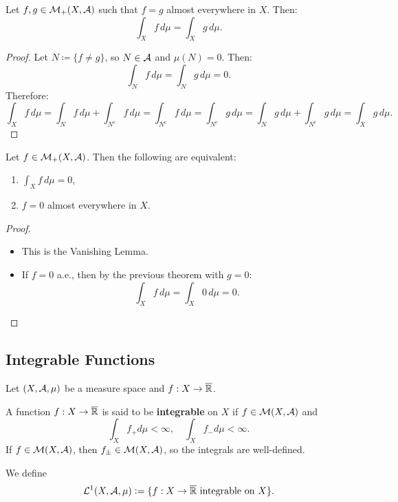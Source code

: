 \begin{theorem}
Let $f, g \in \mathcal{M}_+(X, \mathcal{A})$ such that $f = g$ almost everywhere in $X$. Then:
\[
\int_X f \, d\mu = \int_X g \, d\mu.
\]
\end{theorem}

\begin{proof}
Let $N \coloneqq \{f \neq g\}$, so $N \in \mathcal{A}$ and $\mu(N) = 0$. Then:
\[
\int_N f \, d\mu = \int_N g \, d\mu = 0.
\]
Therefore:
\[
\int_X f \, d\mu = \int_N f \, d\mu + \int_{N^c} f \, d\mu = \int_{N^c} f \, d\mu = \int_{N^c} g \, d\mu = \int_N g \, d\mu + \int_{N^c} g \, d\mu = \int_X g \, d\mu.
\]
\end{proof}

\begin{corollary}
Let $f \in \mathcal{M}_+(X, \mathcal{A})$. Then the following are equivalent:
\begin{enumerate}
    \item $\int_X f \, d\mu = 0$,
    \item $f = 0$ almost everywhere in $X$.
\end{enumerate}
\end{corollary}

\begin{proof}
\begin{itemize}[leftmargin=5em]
    \item [$(1) \Rightarrow (2)$] This is the Vanishing Lemma.
    \item [$(2) \Rightarrow (1)$] If $f = 0$ a.e., then by the previous theorem with $g = 0$:
    \[
    \int_X f \, d\mu = \int_X 0 \, d\mu = 0.
    \]
\end{itemize}
\end{proof}

\subsection{Integrable Functions}

Let $(X, \mathcal{A}, \mu)$ be a measure space and $f : X \to \overline{\mathbb{R}}$.

\begin{definition}
A function $f : X \to \overline{\mathbb{R}}$ is said to be \textbf{integrable} on $X$ if $f \in \mathcal{M}(X, \mathcal{A})$ and
\[
\int_X f_+  d\mu < \infty, \quad \int_X f_-  d\mu < \infty.
\]
If $f \in \mathcal{M}(X, \mathcal{A})$, then $f_\pm \in \mathcal{M}(X, \mathcal{A})$, so the integrals are well-defined.

We define
\[
\mathcal{L}^1(X, \mathcal{A}, \mu) \mathrel{\mathop:}= \{ f : X \to \overline{\mathbb{R}} \text{ integrable on } X \}.
\]
\end{definition}

